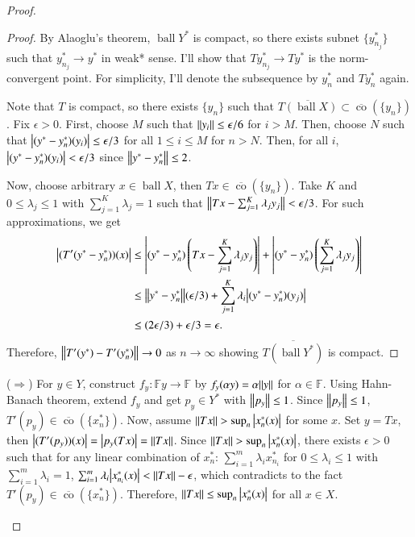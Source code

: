 \documentclass[a4paper, 12pt]{article}
\theoremstyle{Mydefinition}
\theoremstyle{Mytheorem}
\DeclareMathOperator{\co}{co}
\DeclareMathOperator{\ball}{ball}
\begin{document}
\begin{proof}
\begin{enumerate}
\begin{proof}
        By Alaoglu's theorem, $\ball Y^*$ is compact, so there exists subnet $\{y^*_{n_j}\}$ such that $y^*_{n_j}\rightarrow y^*$ in weak* sense. I'll show that $Ty^*_{n_j}\rightarrow Ty^*$ is the norm-convergent point. For simplicity, I'll denote the subsequence by $y^*_n$ and $Ty^*_n$ again.
        
        Note that $T$ is compact, so there exists $\{y_n\}$ such that $\overline{T(\ball X)}\subset \overline{\co}(\{y_n\})$. Fix $\epsilon>0$. First, choose $M$ such that $\norm{y_i}\leq \epsilon/6$ for $i>M$. Then, choose $N$ such that $\abs{(y^*-y^*_n)(y_i)}\leq \epsilon/3$ for all $1\leq i\leq M$ for $n>N$. Then, for all $i$, $\abs{(y^*-y^*_n)(y_i)}<\epsilon/3$ since $\norm{y^*-y^*_n}\leq 2$.
        
        Now, choose arbitrary $x\in \ball X$, then $Tx\in \overline{\co}(\{y_n\})$. Take $K$ and $0\leq \lambda_j\leq 1$ with $\sum_{j=1}^K \lambda_j = 1$ such that $\norm{Tx-\sum_{j=1}^K \lambda_j y_j}<\epsilon/3$. For such approximations, we get
        \begin{equation}
        \begin{split}
            \abs{(T'(y^*-y_n^*))(x)}&\leq\abs{(y^*-y_n^*)\left(Tx-\sum_{j=1}^K \lambda_j y_j\right)} + \abs{(y^*-y_n^*)\left(\sum_{j=1}^K \lambda_j y_j\right)}\\
            &\leq \norm{y^*-y_n^*}(\epsilon/3) + \sum_{j=1}^K \lambda_i \abs{(y^*-y_n^*)( y_j)}\\
            &\leq (2\epsilon/3) + \epsilon/3 = \epsilon.
        \end{split}
        \end{equation}
        Therefore, $\norm{T'(y^*)-T'(y^*_n)}\rightarrow 0$ as $n\rightarrow \infty$ showing $\overline{T(\ball Y^*)}$ is compact.
    \end{proof}
    
    
    ($\Rightarrow$) For $y\in Y$, construct $f_y:\mathbb{F}y\rightarrow \mathbb{F}$ by $f_y(\alpha y) = \alpha \norm{y}$ for $\alpha\in \mathbb{F}$. Using Hahn-Banach theorem, extend $f_y$ and get $p_y\in Y^*$ with $\norm{p_y} \leq 1$. Since $\norm{p_y}\leq 1$, $T'(p_y)\in \overline{\co}(\{x_n^*\})$. Now, assume $\norm{Tx}>\sup_n \abs{x_n^*(x)}$ for some $x$. Set $y = Tx$, then $\abs{(T'(p_y))(x)} = \abs{p_y(Tx)} = \norm{Tx}$. Since $\norm{Tx}>\sup_n \abs{x_n^*(x)}$, there exists $\epsilon>0$ such that for any linear combination of $x_n^*$: $\sum_{i=1}^m \lambda_i x_{n_i}^*$ for $0\leq \lambda_i\leq 1$ with $\sum_{i=1}^m \lambda_i = 1$, $\sum_{i=1}^m \lambda_i \abs{x_{n_i}^*(x)}<\norm{Tx}-\epsilon$, which contradicts to the fact $T'(p_y)\in \overline{\co}(\{x_n^*\})$. Therefore, $\norm{Tx}\leq \sup_n \abs{x_n^*(x)}$ for all $x\in X$.
    

\end{enumerate}
\end{proof}
\end{document}
